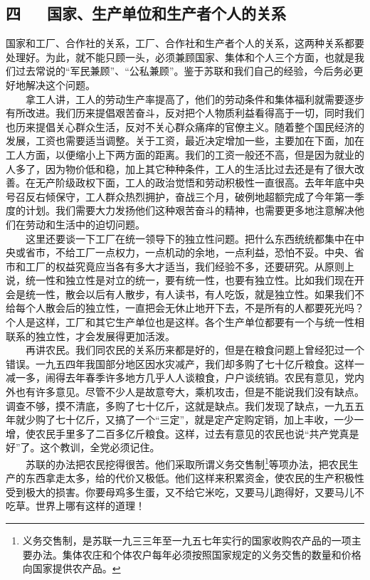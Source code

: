 \documentclass[cn,11pt,chinese]{elegantbook}
\def\myformat#1{\hfil\hfil #1}
\begin{document}
\subsection*{\myformat{四 　  国家、生产单位和生产者个人的关系}}
国家和工厂、合作社的关系，工厂、合作社和生产者个人的关系，这两种关系都要处理好。为此，就不能只顾一头，必须兼顾国家、集体和个人三个方面，也就是我们过去常说的“军民兼顾”、“公私兼顾”。鉴于苏联和我们自己的经验，今后务必更好地解决这个问题。\\
　　拿工人讲，工人的劳动生产率提高了，他们的劳动条件和集体福利就需要逐步有所改进。我们历来提倡艰苦奋斗，反对把个人物质利益看得高于一切，同时我们也历来提倡关心群众生活，反对不关心群众痛痒的官僚主义。随着整个国民经济的发展，工资也需要适当调整。关于工资，最近决定增加一些，主要加在下面，加在工人方面，以便缩小上下两方面的距离。我们的工资一般还不高，但是因为就业的人多了，因为物价低和稳，加上其它种种条件，工人的生活比过去还是有了很大改善。在无产阶级政权下面，工人的政治觉悟和劳动积极性一直很高。去年年底中央号召反右倾保守，工人群众热烈拥护，奋战三个月，破例地超额完成了今年第一季度的计划。我们需要大力发扬他们这种艰苦奋斗的精神，也需要更多地注意解决他们在劳动和生活中的迫切问题。\\
　　这里还要谈一下工厂在统一领导下的独立性问题。把什么东西统统都集中在中央或省市，不给工厂一点权力，一点机动的余地，一点利益，恐怕不妥。中央、省市和工厂的权益究竟应当各有多大才适当，我们经验不多，还要研究。从原则上说，统一性和独立性是对立的统一，要有统一性，也要有独立性。比如我们现在开会是统一性，散会以后有人散步，有人读书，有人吃饭，就是独立性。如果我们不给每个人散会后的独立性，一直把会无休止地开下去，不是所有的人都要死光吗？个人是这样，工厂和其它生产单位也是这样。各个生产单位都要有一个与统一性相联系的独立性，才会发展得更加活泼。\\
　　再讲农民。我们同农民的关系历来都是好的，但是在粮食问题上曾经犯过一个错误。一九五四年我国部分地区因水灾减产，我们却多购了七十亿斤粮食。这样一减一多，闹得去年春季许多地方几乎人人谈粮食，户户谈统销。农民有意见，党内外也有许多意见。尽管不少人是故意夸大，乘机攻击，但是不能说我们没有缺点。调查不够，摸不清底，多购了七十亿斤，这就是缺点。我们发现了缺点，一九五五年就少购了七十亿斤，又搞了一个“三定”，就是定产定购定销，加上丰收，一少一增，使农民手里多了二百多亿斤粮食。这样，过去有意见的农民也说“共产党真是好”了。这个教训，全党必须记住。\\
　　苏联的办法把农民挖得很苦。他们采取所谓义务交售制\footnote[1]{ 义务交售制，是苏联一九三三年至一九五七年实行的国家收购农产品的一项主要办法。集体农庄和个体农户每年必须按照国家规定的义务交售的数量和价格向国家提供农产品。}等项办法，把农民生产的东西拿走太多，给的代价又极低。他们这样来积累资金，使农民的生产积极性受到极大的损害。你要母鸡多生蛋，又不给它米吃，又要马儿跑得好，又要马儿不吃草。世界上哪有这样的道理！\\
\end{document}
